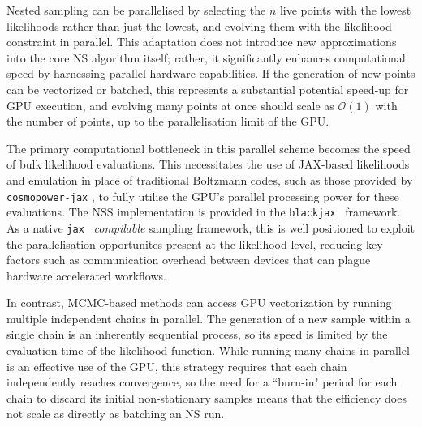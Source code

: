\documentclass[twocolumn]{openjournal}
\begin{document}
Nested sampling can be parallelised by selecting the $n$  live points with the lowest likelihoods rather than just the lowest, and evolving them with the likelihood constraint in parallel. This adaptation does not introduce new approximations into the core NS algorithm itself; rather, it significantly enhances computational speed by harnessing parallel hardware capabilities. If the generation of new points can be vectorized or batched, this represents a substantial potential speed-up for GPU execution, and evolving many points at once should scale as $\mathcal{O}(1)$ with the number of points, up to the parallelisation limit of the GPU.

The primary computational bottleneck in this parallel scheme becomes the speed of bulk likelihood evaluations. This necessitates the use of JAX-based likelihoods and emulation in place of traditional Boltzmann codes, such as those provided by \texttt{cosmopower-jax} \citep{Piras_2023}, to fully utilise the GPU's parallel processing power for these evaluations. The NSS implementation is provided in the \texttt{blackjax}~\citep{cabezas_blackjax_2024} framework. As a native \texttt{jax}~\citep{deepmind_deepmind_2020} \emph{compilable} sampling framework, this is well positioned to exploit the parallelisation opportunites present at the likelihood level, reducing key factors such as communication overhead between devices that can plague hardware accelerated workflows.

In contrast, MCMC-based methods can access GPU vectorization by running multiple independent chains in parallel. The generation of a new sample within a single chain is an inherently sequential process, so its speed is limited by the evaluation time of the likelihood function. While running many chains in parallel is an effective use of the GPU, this strategy requires that each chain independently reaches convergence, so the need for a ``burn-in" period for each chain to discard its initial non-stationary samples \citep{hoffman14a} means that the efficiency does not scale as directly as batching an NS run.
\end{document}
